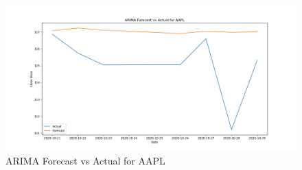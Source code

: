 \documentclass{article}
\begin{document}
\begin{figure}[h]
\centering
\includegraphics[width=\linewidth]{001_AAPL.png}
\caption{ARIMA Forecast vs Actual for AAPL}
\label{fig:AAPL_forecast}
\end{figure}
\end{document}
